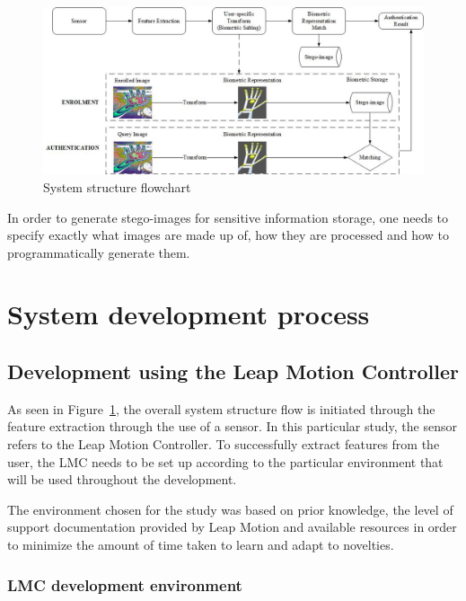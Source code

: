     
    \begin{figure}[htbp!] 
    \centering    
    \includegraphics[width=1.0\textwidth]{Chapter3/Figs/Figure3-4.png}
    \caption[System structure flowchart]{System structure flowchart}
    \label{fig:System structure flowchart}
    \end{figure}
    
In order to generate stego-images for sensitive information storage, one needs to specify exactly what images are made up of, how they are processed and how to programmatically generate them.

\section{System development process}


\subsection{Development using the Leap Motion Controller}

As seen in Figure~\ref{fig:System structure flowchart}, the overall system structure flow is initiated through the feature extraction through the use of a sensor. In this particular study, the sensor refers to the Leap Motion Controller. To successfully extract features from the user, the LMC needs to be set up according to the particular environment that will be used throughout the development. 

The environment chosen for the study was based on prior knowledge, the level of support documentation provided by Leap Motion and available resources in order to minimize the amount of time taken to learn and adapt to novelties. 

\subsubsection{LMC development environment}

